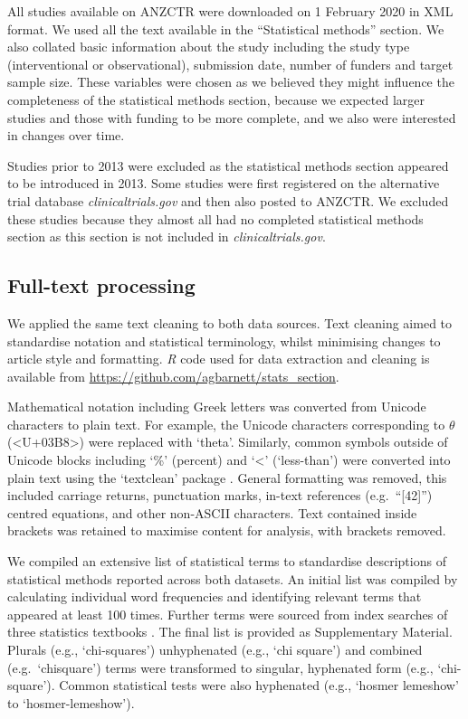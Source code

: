 \documentclass[12pt]{article}
\begin{document}
All studies available on ANZCTR were downloaded on 1 February 2020 in
XML format. We used all the text available in the ``Statistical
methods'' section. We also collated basic information about the study
including the study type (interventional or observational), submission
date, number of funders and target sample size. These variables were
chosen as we believed they might influence the completeness of the
statistical methods section, because we expected larger studies and
those with funding to be more complete, and we also were interested in
changes over time.

Studies prior to 2013 were excluded as the statistical methods section
appeared to be introduced in 2013. Some studies were first registered on
the alternative trial database \emph{clinicaltrials.gov} and then also
posted to ANZCTR. We excluded these studies because they almost all had
no completed statistical methods section as this section is not included
in \emph{clinicaltrials.gov}.

\subsection{Full-text processing}
\label{sec:methods-cleaning}

We applied the same text cleaning to both data sources. Text cleaning
aimed to standardise notation and statistical terminology, whilst
minimising changes to article style and formatting. \emph{R} code used
for data extraction and cleaning is available from
\url{https://github.com/agbarnett/stats_section}.

Mathematical notation including Greek letters was converted from Unicode
characters to plain text. For example, the Unicode characters
corresponding to \(\theta\) (\textless U+03B8\textgreater) were replaced
with `theta'. Similarly, common symbols outside of Unicode blocks
including `\%' (percent) and `\textless{}' (`less-than') were converted
into plain text using the `textclean' package \citep{textclean}. General
formatting was removed, this included carriage returns, punctuation
marks, in-text references (e.g.~``{[}42{]}'') centred equations, and
other non-ASCII characters. Text contained inside brackets was retained
to maximise content for analysis, with brackets removed.

We compiled an extensive list of statistical terms to standardise
descriptions of statistical methods reported across both datasets. An
initial list was compiled by calculating individual word frequencies and
identifying relevant terms that appeared at least 100 times. Further
terms were sourced from index searches of three statistics textbooks
\citep[\citet{Diggle2013},\citet{Bland2015}]{Dobson2018}. The final list
is provided as Supplementary Material. Plurals (e.g., `chi-squares')
unhyphenated (e.g., `chi square') and combined (e.g.~`chisquare') terms
were transformed to singular, hyphenated form (e.g., `chi-square').
Common statistical tests were also hyphenated (e.g., `hosmer lemeshow'
to `hosmer-lemeshow').
\end{document}
